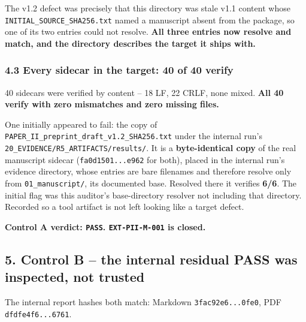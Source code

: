 \documentclass[
  10pt,
]{article}
\newcounter{none} %
\begin{document}
The v1.2 defect was precisely that this directory was stale v1.1 content
whose \texttt{INITIAL\_SOURCE\_SHA256.txt} named a manuscript absent
from the package, so one of its two entries could not resolve.
\textbf{All three entries now resolve and match, and the directory
describes the target it ships with.}

\subsubsection{4.3 Every sidecar in the target: 40 of 40
verify}\label{every-sidecar-in-the-target-40-of-40-verify}

40 sidecars were verified by content -- 18 LF, 22 CRLF, none mixed.
\textbf{All 40 verify with zero mismatches and zero missing files.}

One initially appeared to fail: the copy of
\texttt{PAPER\_II\_preprint\_draft\_v1.2\_SHA256.txt} under the internal
run's \texttt{20\_EVIDENCE/R5\_ARTIFACTS/results/}. It is a
\textbf{byte-identical copy} of the real manuscript sidecar
(\texttt{fa0d1501...e962} for both), placed in the internal run's
evidence directory, whose entries are bare filenames and therefore
resolve only from \texttt{01\_manuscript/}, its documented base.
Resolved there it verifies \textbf{6/6}. The initial flag was this
auditor's base-directory resolver not including that directory. Recorded
so a tool artifact is not left looking like a target defect.

\textbf{Control A verdict: \texttt{PASS}. \texttt{EXT-PII-M-001} is
closed.}

\subsection{5. Control B -- the internal residual PASS was inspected,
not
trusted}\label{control-b-the-internal-residual-pass-was-inspected-not-trusted}

The internal report hashes both match: Markdown
\texttt{3fac92e6...0fe0}, PDF \texttt{dfdfe4f6...6761}.
\end{document}

